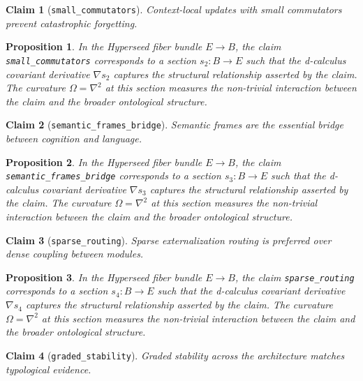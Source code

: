 \documentclass{article}
\newtheorem{claim}{Claim}
\newtheorem{proposition}{Proposition}
\begin{document}
\begin{claim}[\texttt{small_commutators}]
Context-local updates with small commutators prevent catastrophic forgetting.
\end{claim}

\begin{proposition}
In the Hyperseed fiber bundle $E \to B$, the claim \texttt{small_commutators} corresponds to a section $s_2: B \to E$ such that the d-calculus covariant derivative $\nabla s_2$ captures the structural relationship asserted by the claim. The curvature $\Omega = \nabla^2$ at this section measures the non-trivial interaction between the claim and the broader ontological structure.
\end{proposition}

\begin{claim}[\texttt{semantic_frames_bridge}]
Semantic frames are the essential bridge between cognition and language.
\end{claim}

\begin{proposition}
In the Hyperseed fiber bundle $E \to B$, the claim \texttt{semantic_frames_bridge} corresponds to a section $s_3: B \to E$ such that the d-calculus covariant derivative $\nabla s_3$ captures the structural relationship asserted by the claim. The curvature $\Omega = \nabla^2$ at this section measures the non-trivial interaction between the claim and the broader ontological structure.
\end{proposition}

\begin{claim}[\texttt{sparse_routing}]
Sparse externalization routing is preferred over dense coupling between modules.
\end{claim}

\begin{proposition}
In the Hyperseed fiber bundle $E \to B$, the claim \texttt{sparse_routing} corresponds to a section $s_4: B \to E$ such that the d-calculus covariant derivative $\nabla s_4$ captures the structural relationship asserted by the claim. The curvature $\Omega = \nabla^2$ at this section measures the non-trivial interaction between the claim and the broader ontological structure.
\end{proposition}

\begin{claim}[\texttt{graded_stability}]
Graded stability across the architecture matches typological evidence.
\end{claim}
\end{document}
